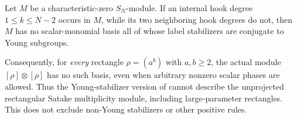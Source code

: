 \begin{finding}\label{f:recthooks}
Let $M$ be a characteristic-zero $S_N$-module. If an internal hook
degree $1\le k\le N-2$ occurs in $M$, while its two neighboring
hook degrees do not, then $M$ has no scalar-monomial basis all of
whose label stabilizers are conjugate to Young subgroups.

Consequently, for \emph{every} rectangle $\rho=(a^b)$ with $a,b\ge2$,
the actual module $[\rho]\otimes[\rho]$ has no such basis, even when
arbitrary nonzero scalar phases are allowed. Thus the Young-stabilizer
version of  cannot describe the unprojected rectangular
Satake multiplicity module, including large-parameter rectangles.
This does not exclude non-Young stabilizers or other positive rules.
\end{finding}

